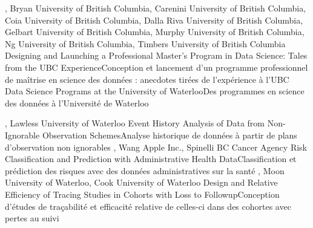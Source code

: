 {
,  {Bryan}
{University of British Columbia},  {Carenini}
{University of British Columbia},  {Coia}
{University of British Columbia},  {Dalla Riva}
{University of British Columbia},  {Gelbart}
{University of British Columbia},  {Murphy}
{University of British Columbia},  { Ng}
{University of British Columbia},  {Timbers}
{University of British Columbia}
}
{Designing and Launching a Professional Master’s Program in Data Science: Tales from the UBC Experience}{Conception et lancement d’un programme professionnel de maîtrise en science des données : anecdotes tirées de l’expérience à l'UBC }
{\bubbleE \enspace \screenE}
{
}
{Data Science Programs at the University of Waterloo}{Des programmes en science des données à l'Université de Waterloo }
{\bubbleE \enspace \screenE}


{
,  {Lawless}
{University of Waterloo}
}
{Event History Analysis of Data from Non-Ignorable Observation Schemes}{Analyse historique de données à partir de plans d’observation non ignorables }
{\bubbleE \enspace \screenE}
{
,  {Wang}
{Apple Inc.},  {Spinelli}
{BC Cancer Agency}
}
{Risk Classification and Prediction with Administrative Health Data}{Classification et prédiction des risques avec des données administratives sur la santé}
{\bubbleE \enspace \screenE}
{
,  {Moon}
{University of Waterloo},  {Cook}
{University of Waterloo}
}
{Design and Relative Efficiency of Tracing Studies in Cohorts with Loss to Followup}{Conception d’études de traçabilité et efficacité relative de celles-ci dans des cohortes avec pertes au suivi}
{\bubbleE \enspace \screenE}


